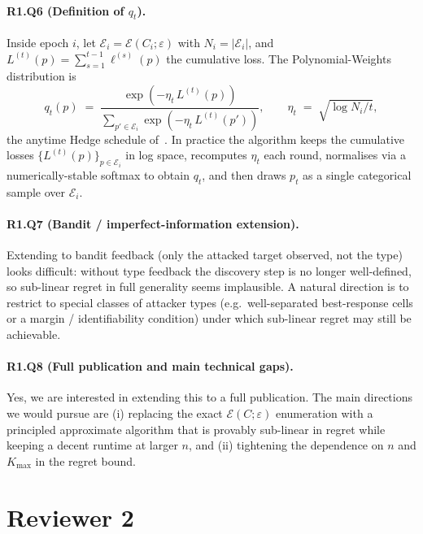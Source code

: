 \documentclass[11pt]{article}
\begin{document}
\paragraph{R1.Q6 (Definition of $q_t$).}
Inside epoch $i$, let $\mathcal E_i = \mathcal E(C_i;\varepsilon)$ with
$N_i=|\mathcal E_i|$, and $L^{(t)}(p)=\sum_{s=1}^{t-1}\ell^{(s)}(p)$
the cumulative loss. The Polynomial-Weights distribution is
\begin{equation}
q_t(p) \;=\;
\frac{\exp\!\left(-\eta_t\, L^{(t)}(p)\right)}
     {\sum_{p'\in\mathcal E_i}\exp\!\left(-\eta_t\, L^{(t)}(p')\right)},
\qquad
\eta_t \;=\; \sqrt{\log N_i / t},
\label{eq:qt}
\end{equation}
the anytime Hedge schedule of~\cite{CesaBianchi2007,CL06}. In
practice the algorithm keeps the cumulative losses
$\{L^{(t)}(p)\}_{p\in\mathcal E_i}$ in log space, recomputes
$\eta_t$ each round, normalises via a numerically-stable softmax to
obtain $q_t$, and then draws $p_t$ as a single categorical sample
over $\mathcal E_i$. 

\paragraph{R1.Q7 (Bandit / imperfect-information extension).}
Extending to bandit feedback (only the attacked target observed,
not the type) looks difficult: without type feedback the discovery
step is no longer well-defined, so sub-linear regret in full
generality seems implausible. A natural direction is to restrict to
special classes of attacker types (e.g.\ well-separated
best-response cells or a margin / identifiability condition) under
which sub-linear regret may still be achievable.

\paragraph{R1.Q8 (Full publication and main technical gaps).}
Yes, we are interested in extending this to a full publication. The
main directions we would pursue are (i) replacing the exact
$\mathcal E(C;\varepsilon)$ enumeration with a principled approximate
algorithm that is provably sub-linear in regret while keeping a
decent runtime at larger $n$, and (ii) tightening the dependence on
$n$ and $K_{\max}$ in the regret bound.

\section*{Reviewer 2}
\end{document}

